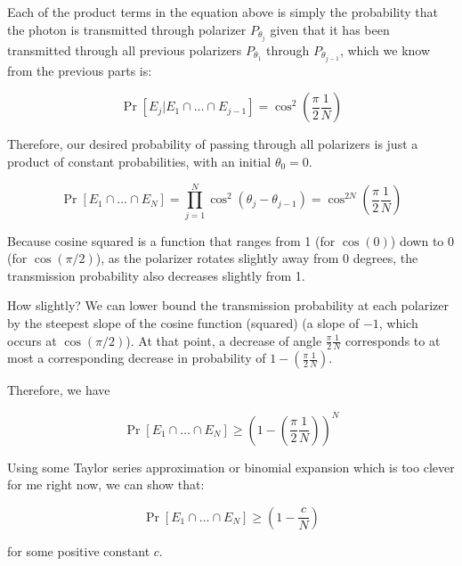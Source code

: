 \documentclass[12pt]{article}
\begin{document}
\begin{enumerate}
Each of the product terms in the equation above is simply the probability
that the photon is transmitted through polarizer $P_{\theta_j}$ given that
it has been transmitted through all previous polarizers $P_{\theta_1}$ through
$P_{\theta_{j-1}}$, which we know from the previous parts is:

\begin{equation}
\Pr[E_j | E_1 \cap \ldots \cap E_{j-1}] = \cos^2(\frac{\pi}{2}\frac{1}{N})
\end{equation}

Therefore, our desired probability of passing through all polarizers is
just a product of constant probabilities, with an initial $\theta_0 = 0$.

\begin{equation}
\Pr[E_1 \cap \ldots \cap E_N] = \prod_{j=1}^{N} \cos^2(\theta_j - \theta_{j-1}) = \cos^{2N}(\frac{\pi}{2}\frac{1}{N})
\end{equation}

Because cosine squared is a function that ranges from 1 (for $\cos(0)$) down to 0
(for $\cos(\pi/2)$), as the polarizer rotates slightly away from 0 degrees,
the transmission probability also decreases slightly from 1.

How slightly? We can lower bound the transmission probability at each polarizer
by the steepest slope of the cosine function (squared) (a slope of $-1$,
which occurs at $\cos(\pi/2)$). At that point, a decrease of angle
$\frac{\pi}{2}\frac{1}{N}$ corresponds to at most a corresponding decrease in
probability of $1 - (\frac{\pi}{2}\frac{1}{N})$.

Therefore, we have

\begin{equation}
\Pr[E_1 \cap \ldots \cap E_N] \ge (1-(\frac{\pi}{2}\frac{1}{N}))^N
\end{equation}

Using some Taylor series approximation or binomial expansion which is too clever
for me right now, we can show that:

\begin{equation}
\Pr[E_1 \cap \ldots \cap E_N] \ge (1-\frac{c}{N})
\end{equation}

for some positive constant $c$.

\end{enumerate}

\pagebreak

\setcounter{section}{1}
\end{document}
